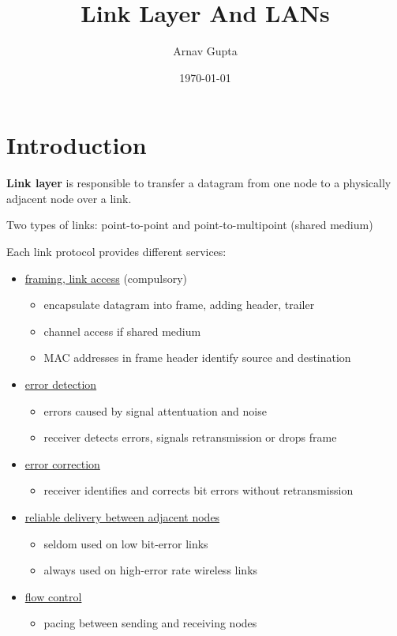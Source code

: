 \documentclass[11pt]{article}
\author{Arnav Gupta}
\date{\today}
\title{Link Layer And LANs}
\begin{document}
\maketitle
\tableofcontents

\section{Introduction}
\label{sec:org0e1a269}
\textbf{Link layer} is responsible to transfer a datagram from one node to a physically adjacent node over
a link.

Two types of links: point-to-point and point-to-multipoint (shared medium)

Each link protocol provides different services:
\begin{itemize}
\item \uline{framing, link access} (compulsory)
\begin{itemize}
\item encapsulate datagram into frame, adding header, trailer
\item channel access if shared medium
\item MAC addresses in frame header identify source and destination
\end{itemize}
\item \uline{error detection}
\begin{itemize}
\item errors caused by signal attentuation and noise
\item receiver detects errors, signals retransmission or drops frame
\end{itemize}
\item \uline{error correction}
\begin{itemize}
\item receiver identifies and corrects bit errors without retransmission
\end{itemize}
\item \uline{reliable delivery between adjacent nodes}
\begin{itemize}
\item seldom used on low bit-error links
\item always used on high-error rate wireless links
\end{itemize}
\item \uline{flow control}
\begin{itemize}
\item pacing between sending and receiving nodes
\end{itemize}
\end{itemize}
\end{document}
